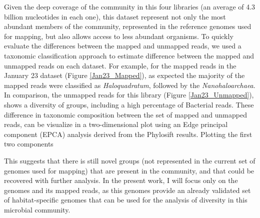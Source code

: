 Given the deep coverage of the community in this four libraries (an average of 4.3 billion nucleotides in each one), this dataset represent not only the most abundant members of the community, represented in the reference genomes used for mapping, but also allows access to less abundant organisms. To quickly evaluate the differences between the mapped and unmapped reads, we used a taxonomic classification approach to estimate difference between the mapped and unmapped reads on each dataset. For example, for the mapped reads in the January 23 dataset (Figure \ref{Jan23_Mapped}), as expected the majority of the mapped reads were classified as \textit{Haloquadratum}, followed by the \textit{Nanohaloarchaea}. In comparison, the unmapped reads for this library (Figure \ref{Jan23_Unmapped}), shows a diversity of groups, including a high percentage of Bacterial reads. These difference in taxonomic composition between the set of mapped and unmapped reads, can be visualize in a two-dimensional plot using an Edge principal component (EPCA) analysis \cite{Matsen:2011wn} derived from the Phylosift results. Plotting the first two components




This suggests that there is still novel groups (not represented in the current set of genomes used for mapping) that are present in the community, and that could be recovered with further analysis. In the present work, I will focus only on the genomes and its mapped reads, as this genomes provide an already validated set of habitat-specific genomes that can be used for the analysis of diversity in this microbial community.

